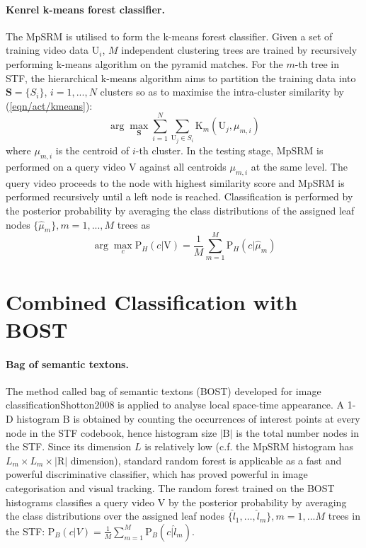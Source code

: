 \paragraph{Kenrel k-means forest classifier.}
The MpSRM is utilised to form the k-means forest classifier. Given a set of training video data $\mathrm{U}_i$, $M$ independent clustering trees are trained by recursively performing k-means algorithm on the pyramid matches. For the $m$-th tree in STF, the hierarchical k-means algorithm aims to partition the training data into $\mathbf{S}=\{S_i\}$, $i=1,...,N$ clusters so as to maximise the intra-cluster similarity by (\ref{eqn/act/kmeans}):
\begin{equation}
\arg\max_{\mathbf{S}} \displaystyle\sum_{i = 1}^{N}\sum_{\mathrm{U}_j \in S_{i}} \mathrm{K}_m(\mathrm{U}_j, \mu_{m,i})
\label{eqn/act/kmeans}
\end{equation}
where $\mu_{m,i}$ is the centroid of $i$-th cluster. In the testing stage, MpSRM is performed on a query video $\mathrm{V}$ against all centroids $\mu_{m,i}$ at the same level. The query video proceeds to the node with highest similarity score and MpSRM is performed recursively until a left node is reached. Classification is performed by the posterior probability by averaging the class distributions of the assigned leaf nodes $\{ \hat{\mu}_m \}, m=1,...,M$ trees as
\begin{equation}
\arg\max_{c}\mathrm{P}_{H}(c|\mathrm{V}) = \frac{1}{M}\displaystyle\sum_{m=1}^{M}\mathrm{P}_{H}(c|\hat{\mu}_{m})
\end{equation}

\section{Combined Classification with BOST}
\label{sec/act/combine}

\paragraph{Bag of semantic textons.}
The method called bag of semantic textons (BOST) developed for image classification{Shotton2008} is applied to analyse local space-time appearance. A 1-D histogram $\mathrm{B}$ is obtained by counting the occurrences of interest points at every node in the STF codebook, hence histogram size $|\mathrm{B}|$ is the total number nodes in the STF. Since its dimension $L$ is relatively low (c.f. the MpSRM histogram has $L_m \times L_m \times |\mathrm{R}|$ dimension), standard random forest \cite{Breiman2001} is applicable as a fast and powerful discriminative classifier, which has proved powerful in image categorisation and visual tracking. The random forest trained on the BOST histograms classifies a query video $\mathrm{V}$ by the posterior probability by averaging the class distributions over the assigned leaf nodes $\{\hat{l}_1,\dots,\hat{l}_{m}\}, m=1,...M$ trees in the STF: $\mathrm{P}_{B}(c|V) = \frac{1}{M}\sum_{m=1}^{M}\mathrm{P}_{B}(c|\hat{l}_m)$.

